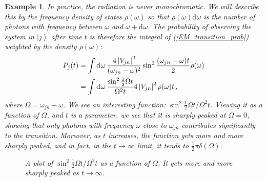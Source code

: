 \documentclass{article}
\theoremstyle{plain}\theoremheaderfont{\normalfont\itshape}\theorembodyfont{\rmfamily}\theoremseparator{.}\newtheorem*{rem}{Remark}\newtheorem*{ex}{Example}\newtheorem*{proof}{Proof}\newtheorem*{altp}{Alternative proof}
\theoremstyle{plain}\theoremheaderfont{\normalfont\bfseries}\theorembodyfont{\rmfamily}\theoremseparator{.}\newtheorem{thm}{Theorem}[section]\newtheorem{lem}[thm]{Lemma}\newtheorem{prop}[thm]{Proposition}\newtheorem*{cor}{Corollary}\newtheorem{defn}[thm]{Definition}\newtheorem{clm}[thm]{Claim}\newtheorem{clminproof}{Claim}
\theoremstyle{break}\theoremheaderfont{\normalfont\itshape}\theorembodyfont{\rmfamily}\theoremseparator{.\medskip}\newtheorem*{proofskip}{Proof}\newtheorem*{exs}{Examples}\newtheorem*{rems}{Remarks}
\theoremstyle{break}\theoremheaderfont{\normalfont\bfseries}\theorembodyfont{\rmfamily}\theoremseparator{.\medskip}\newtheorem{lemskip}[thm]{Lemma}\newtheorem{defnskip}[thm]{Definition}\newtheorem{propskip}[thm]{Proposition}\newtheorem{thmskip}[thm]{Theorem}
\numberwithin{equation}{section}
\newcommand{\dd}[2][]{\mathrm{d}^{#1} #2\,}
\renewcommand{\d}[2][]{\mathrm{d}^{#1} #2}
\newcommand{\ket}[1]{\left| #1 \right\rangle}
\newcommand{\abs}[1]{\left| #1 \right|}
\begin{document}
\begin{ex}
        In practice, the radiation is never monochromatic. We will describe this by the frequency density of states \(\rho(\omega)\) so that \(\rho(\omega)\d{\omega}\) is the number of photons with frequency between \(\omega\) and \(\omega+\d{\omega}\). The probability of observing the system in \(\ket{j}\) after time \(t\) is therefore the integral of (\ref{EM_transition_prob}) weighted by the density \(\rho(\omega)\):
        \begin{align}
            P_j(t)&=\int\dd{\omega}\frac{4\abs{V_{jn}}^2}{(\omega_{jn}-\omega)^2}\sin^2\frac{(\omega_{jn}-\omega)t}{2}\rho(\omega)\notag\\
            &=\int\dd{\omega}\frac{\sin^2\frac{1}{2}\Omega t}{\Omega^2 t}4\abs{V_{jn}}^2\rho(\omega)t\,,
        \end{align}
        where \(\Omega=\omega_{jn}-\omega\). We see an interesting function: \(\sin^2\frac{1}{2}\Omega t/\Omega^2 t\). Viewing it as a function of \(\Omega\), and \(t\) is a parameter, we see that it is sharply peaked at \(\Omega=0\), showing that only photons with frequency \(\omega\) close to \(\omega_{jn}\) contributes significantly to the transition. Moreover, as \(t\) increases, the function gets more and more sharply peaked, and in fact, in the \(t\to\infty\) limit, it tends to \(\frac{1}{2}\pi\delta(\Omega)\).

        \begin{figure}
            \centering
            \caption{A plot of \(\sin^2\frac{1}{2}\Omega t/\Omega^2 t\) as a function of \(\Omega\). It gets more and more sharply peaked as \(t\to\infty\).}
        \end{figure}


\end{ex}
\end{document}
